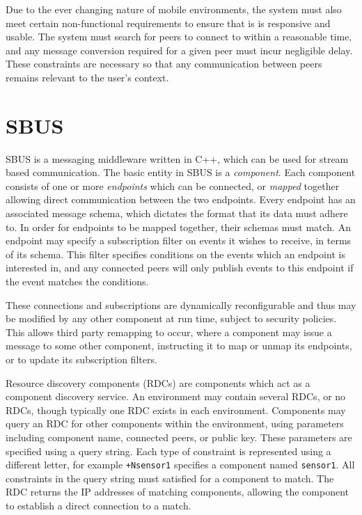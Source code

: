 \documentclass[12pt,twoside,notitlepage]{report}
\begin{document}
Due to the ever changing nature of mobile environments, the system must also meet certain non-functional requirements to ensure that is is responsive and usable. 
The system must search for peers to connect to within a reasonable time, and any message conversion required for a given peer must incur negligible delay.
These constraints are necessary so that any communication between peers remains relevant to the user's context.

\section{SBUS}

SBUS \cite{ingram2009reconfigurable} is a messaging middleware written in C++, which can be used for stream based communication. 
The basic entity in SBUS is a {\sl component}. 
Each component consists of one or more {\sl endpoints} which can be connected, or {\sl mapped} together allowing direct communication between the two endpoints. 
Every endpoint has an associated message schema, which dictates the format that its data must adhere to. 
In order for endpoints to be mapped together, their schemas must match. 
An endpoint may specify a subscription filter on events it wishes to receive, in terms of its schema. 
This filter specifies conditions on the events which an endpoint is interested in, and any connected peers will only publish events to this endpoint if the event matches the conditions.

These connections and subscriptions are dynamically reconfigurable and thus may be modified by any other component at run time, subject to security policies. 
This allows third party remapping to occur, where a component may issue a message to some other component, instructing it to map or unmap its endpoints, or to update its subscription filters.

Resource discovery components (RDCs) are components which act as a component discovery service. 
An environment may contain several RDCs, or no RDCs, though typically one RDC exists in each environment.
Components may query an RDC for other components within the environment, using parameters including component name, connected peers, or public key. 
These parameters are specified using a query string. 
Each type of constraint is represented using a different letter, for example {\tt +Nsensor1} specifies a component named {\tt sensor1}. 
All constraints in the query string must satisfied for a component to match. 
The RDC returns the IP addresses of matching components, allowing the component to establish a direct connection to a match.
\end{document}
